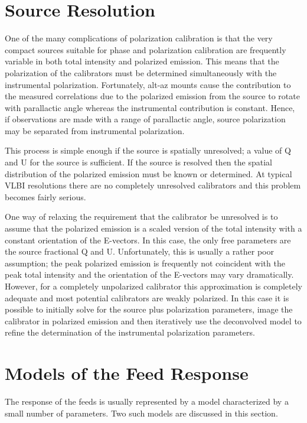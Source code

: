 \section {Source Resolution}

   One of the many complications of polarization calibration is that
the very compact sources suitable for phase and polarization
calibration are frequently variable in both total intensity and
polarized emission.  This means that the polarization of the
calibrators must be determined simultaneously with the instrumental
polarization.  Fortunately, alt-az mounts cause the contribution to
the measured correlations due to the polarized emission from the
source to rotate with parallactic angle whereas the instrumental
contribution is constant.  Hence, if observations are made with a
range of parallactic angle, source polarization may be separated from
instrumental polarization.

   This process is simple enough if the source is spatially
unresolved; a value of Q and U for the source is sufficient.  If the
source is resolved then the spatial distribution of the polarized
emission must be known or determined.  At typical VLBI resolutions
there are no completely unresolved calibrators and this problem
becomes fairly serious.

   One way of relaxing the requirement that the calibrator be
unresolved is to assume that the polarized emission is a scaled
version of the total intensity with a constant orientation of the
E-vectors.  In this case, the only free parameters are the source
fractional Q and U.  Unfortunately, this is usually a rather poor
assumption; the peak polarized emission is frequently not coincident
with the peak total intensity and the orientation of the E-vectors may
vary dramatically.  However, for a completely unpolarized calibrator
this approximation is completely adequate and most potential
calibrators are weakly polarized.  In this case it is possible to
initially solve for the source plus polarization parameters, image the
calibrator in polarized emission and then iteratively use the
deconvolved model to refine the determination of the instrumental
polarization parameters.

\section {Models of the Feed Response}

   The response of the feeds is usually represented by a model
characterized by a small number of parameters.  Two such models are
discussed in this section.

